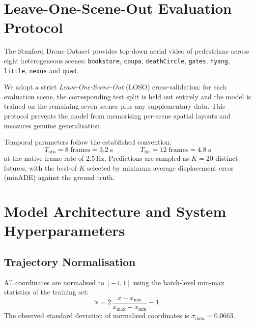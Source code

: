 \documentclass[11pt,a4paper]{article}
\begin{document}
\section{Leave-One-Scene-Out Evaluation Protocol}
\label{sec:lososdd}
The Stanford Drone Dataset \citep{robicquet2016learning} provides top-down aerial video of pedestrians across eight heterogeneous scenes: \texttt{bookstore}, \texttt{coupa}, \texttt{deathCircle}, \texttt{gates}, \texttt{hyang}, \texttt{little}, \texttt{nexus} and \texttt{quad}.

We adopt a strict \emph{Leave-One-Scene-Out} (LOSO) cross-validation: for each evaluation scene, the corresponding test split is held out entirely and the model is trained on the remaining seven scenes plus any supplementary data.  This protocol prevents the model from memorising per-scene spatial layouts and measures genuine generalisation.

Temporal parameters follow the established convention:
\[
T_{\mathrm{obs}} = 8\;\text{frames} = 3.2\;\text{s} \qquad\qquad
T_{\mathrm{fut}}  = 12\;\text{frames} = 4.8\;\text{s}
\]
at the native frame rate of $2.5$\,Hz.  Predictions are sampled as $K=20$ distinct futures, with the best-of-$K$ selected by minimum average displacement error (minADE) against the ground truth.

\section{Model Architecture and System Hyperparameters}
\label{sec:arch}

\subsection{Trajectory Normalisation}
All coordinates are normalised to $[-1,1]$ using the batch-level min-max statistics of the training set:
\begin{equation}
\tilde{x} = 2\,\frac{x - x_{\min}}{x_{\max} - x_{\min}} - 1.
\label{eq:minmax}
\end{equation}
The observed standard deviation of normalised coordinates is $\sigma_{\mathrm{data}} = 0.0663$.
\end{document}
